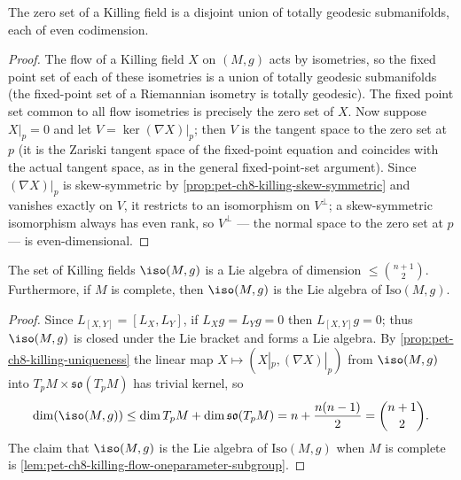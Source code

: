 \begin{theorem}[Theorem 8.1.5]
  \label{thm:pet-ch8-zero-set-totally-geodesic}
  The zero set of a Killing field is a disjoint union of totally geodesic
  submanifolds, each of even codimension.
\end{theorem}
\begin{proof}
  The flow of a Killing field $X$ on $(M,g)$ acts by isometries, so the fixed
  point set of each of these isometries is a union of totally geodesic
  submanifolds (the fixed-point set of a Riemannian isometry is totally
  geodesic). The fixed point set common to all flow isometries is precisely the
  zero set of $X$. Now suppose $X|_p=0$ and let $V=\ker(\nabla X)|_p$; then $V$
  is the tangent space to the zero set at $p$ (it is the Zariski tangent space
  of the fixed-point equation and coincides with the actual tangent space, as in
  the general fixed-point-set argument). Since $(\nabla X)|_p$ is skew-symmetric
  by \cref{prop:pet-ch8-killing-skew-symmetric} and vanishes exactly on $V$, it
  restricts to an isomorphism on $V^\perp$; a skew-symmetric isomorphism always
  has even rank, so $V^\perp$ — the normal space to the zero set at $p$ — is
  even-dimensional.
\end{proof}

\begin{theorem}[Theorem 8.1.6]
  \label{thm:pet-ch8-isometry-lie-algebra-dimension}
  The set of Killing fields $\iso(M,g)$ is a Lie algebra of dimension
  $\le\binom{n+1}{2}$. Furthermore, if $M$ is complete, then $\iso(M,g)$ is the
  Lie algebra of $\mathrm{Iso}(M,g)$.
\end{theorem}
\begin{proof}
  Since $L_{[X,Y]}=[L_X,L_Y]$, if $L_Xg=L_Yg=0$ then $L_{[X,Y]}g=0$; thus
  $\iso(M,g)$ is closed under the Lie bracket and forms a Lie algebra. By
  \cref{prop:pet-ch8-killing-uniqueness} the linear map
  $X\mapsto(X|_p,(\nabla X)|_p)$ from $\iso(M,g)$ into
  $T_pM\times\mathfrak{so}(T_pM)$ has trivial kernel, so
  \[
    \dim(\iso(M,g))\le\dim T_pM+\dim\mathfrak{so}(T_pM)=n+\frac{n(n-1)}{2}=\binom{n+1}{2}.
  \]
  The claim that $\iso(M,g)$ is the Lie algebra of $\mathrm{Iso}(M,g)$ when $M$ is
  complete is \cref{lem:pet-ch8-killing-flow-oneparameter-subgroup}.
\end{proof}


